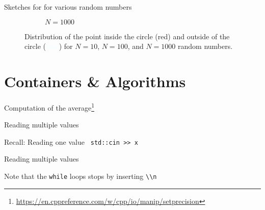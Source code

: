 \documentclass[\classoption]{beamer}
\begin{document}
\begin{frame}{Sketches for for various random numbers}
\begin{figure}[ht]
\begin{subfigure}{.3\textwidth}
  \caption{$N=1000$}
  \label{fig:sub-second}
\end{subfigure}
\caption{Distribution of the point inside the circle (\textcolor{awesome}{red}) and outside of the circle (\textcolor{azure}{blue}) for $N=10$, $N=100$, and $N=1000$ random numbers.}
\label{fig:monte:carlo:samples}
\end{figure}
\end{frame}

\section{Containers \& Algorithms}

\begin{frame}{Computation of the average\footnote{\tiny\url{https://en.cppreference.com/w/cpp/io/manip/setprecision}}}




\end{frame}

\begin{frame}{Reading multiple values}

\begin{block}{Recall: Reading one value}
\lstinline| std::cin >> x|
\end{block}

\begin{block}{Reading multiple values}

\end{block}

Note that the \lstinline|while| loops stops by inserting \lstinline|\\n|

\end{frame}
\end{document}
